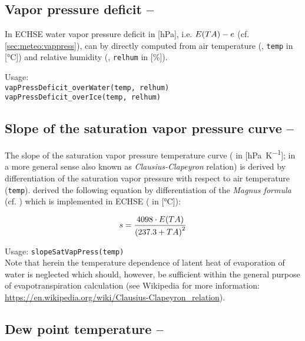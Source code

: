 \subsection{Vapor pressure deficit -- \vaporPressureDeficit} \label{sec:meteo:vappressdef}
In ECHSE water vapor pressure deficit in [\si{\hecto\pascal}], i.e. $E{(TA{})} - e{}$ (cf.  \ref{sec:meteo:vappress}), can by directly computed from air temperature (\airtemp{}, \verb!temp! in [\si{\degreeCelsius}]) and relative humidity (\relHumidity{}, \verb!relhum! in [\si{\percent}]).

\noindent
Usage:\\
\verb!vapPressDeficit_overWater(temp, relhum)!\\
\verb!vapPressDeficit_overIce(temp, relhum)!


\subsection{Slope of the saturation vapor pressure curve -- \slopeSatVapCurve} \label{sec:meteo:slopevappress}
The slope of the saturation vapor pressure temperature curve (\slopeSatVapCurve{} in [\si{\hecto\pascal\per\kelvin}]; in a more general sense also known as \emph{Clausius-Clapeyron} relation) is derived by differentiation of the saturation vapor pressure \satVaporPressure{} with respect to air temperature \airtemp{} (\verb!temp!). \citet{Dyck1995} derived the following equation by differentiation of the \emph{Magnus formula} (cf. ) which is implemented in ECHSE (\airtemp{} in [\si{\degreeCelsius}]):

\begin{equation} \label{eqn:meteo:slopeSatVapCurve}
s{} = \frac{4098 \cdot E{(TA{})}}{\left( 237.3 + TA{} \right)^2}
\end{equation}

\noindent
Usage:
\verb!slopeSatVapPress(temp)!\\

Note that herein the temperature dependence of latent heat of evaporation of water is neglected which should, however, be sufficient within the general purpose of evapotranspiration calculation (see Wikipedia for more information: \url{https://en.wikipedia.org/wiki/Clausius-Clapeyron_relation}).


\subsection{Dew point temperature -- \dewpointTemperature} \label{sec:meteo:dewtemp}

